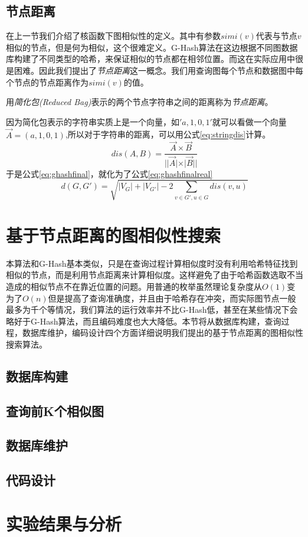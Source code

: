 \documentclass{XDBAthesis}
\begin{document}
\subsection{节点距离}
在上一节我们介绍了核函数下图相似性的定义。其中有参数$simi(v)$代表与节点$v$相似的节点，但是何为相似，这个很难定义。G-Hash算法在这边根据不同图数据库构建了不同类型的哈希，来保证相似的节点都在相邻位置。而这在实际应用中很是困难。因此我们提出了\emph{节点距离}这一概念。我们用查询图每个节点和数据图中每个节点的节点距离作为$simi(v)$的值。
\begin{defn}[节点距离]
    用\emph{简化包(Reduced Bag)}表示的两个节点字符串之间的距离称为\emph{节点距离}。
\end{defn}
因为简化包表示的字符串实质上是一个向量，如$'a,1,0,1'$就可以看做一个向量$\vec{A}=(a,1,0,1) $,所以对于字符串的距离，可以用公式\ref{eq:stringdis}计算。
\begin{equation}
    dis(A,B)=\frac{\vec{A}\times \vec{B}}{||\vec{A}|\times |\vec{B}||}
    \label{eq:stringdis}
\end{equation}
于是公式\ref{eq:ghashfinal}，就化为了公式\eqref{eq:ghashfinalreal}
\begin{equation}
     d(G,G')=\sqrt{|V_{G}|+|V_{G'}| -2\sum_{v\in G',u\in G}dis(v,u)}
     \label{eq:ghashfinalreal}
\end{equation}
\section{基于节点距离的图相似性搜索}
本算法和G-Hash\cite{ghash}基本类似，只是在查询过程计算相似度时没有利用哈希特征找到相似的节点，而是利用节点距离来计算相似度。这样避免了由于哈希函数选取不当造成的相似节点不在靠近位置的问题。用普通的枚举虽然理论复杂度从$O(1)$变为了$O(n)$但是提高了查询准确度，并且由于哈希存在冲突，而实际图节点一般最多为千个等情况，我们算法的运行效率并不比G-Hash低，甚至在某些情况下会略好于G-Hash算法，而且编码难度也大大降低。本节将从数据库构建，查询过程，数据库维护，编码设计四个方面详细说明我们提出的基于节点距离的图相似性搜索算法。
\subsection{数据库构建}

\subsection{查询前K个相似图}
\subsection{数据库维护}
\subsection{代码设计}
\section{实验结果与分析}
\ifx\allfiles\undefined
%

\end{document}
